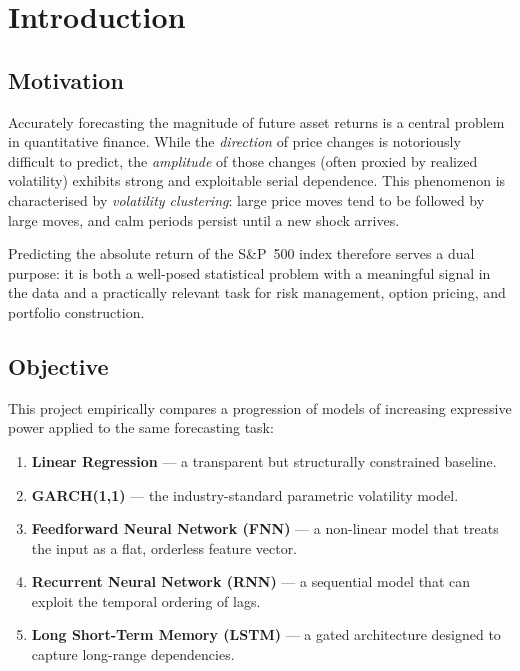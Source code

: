 \section{Introduction}
\label{sec:introduction}

\subsection{Motivation}

Accurately forecasting the magnitude of future asset returns is a central problem in
quantitative finance. While the \emph{direction} of price changes is notoriously
difficult to predict, the \emph{amplitude} of those changes (often proxied by realized
volatility) exhibits strong and exploitable serial dependence. This phenomenon is
characterised by \emph{volatility clustering}: large
price moves tend to be followed by large moves, and calm periods persist until a new
shock arrives.

Predicting the absolute return of the S\&P~500 index therefore serves a dual purpose: it
is both a well-posed statistical problem with a meaningful signal in the data and a
practically relevant task for risk management, option pricing, and portfolio construction.

\subsection{Objective}

This project empirically compares a progression of models of increasing expressive power
applied to the same forecasting task:

\begin{enumerate}
  \item \textbf{Linear Regression} --- a transparent but structurally constrained baseline.
  \item \textbf{GARCH(1,1)} --- the industry-standard parametric volatility model.
  \item \textbf{Feedforward Neural Network (FNN)} --- a non-linear model that treats the
        input as a flat, orderless feature vector.
  \item \textbf{Recurrent Neural Network (RNN)} --- a sequential model that can exploit
        the temporal ordering of lags.
  \item \textbf{Long Short-Term Memory (LSTM)} --- a gated architecture designed to
        capture long-range dependencies.
\end{enumerate}

